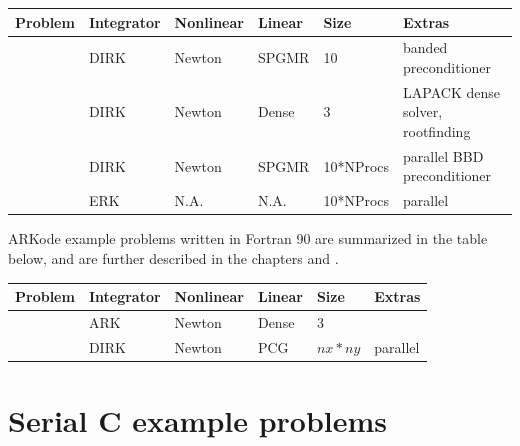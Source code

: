 \documentclass[letterpaper,10pt,english]{sphinxmanual}
\begin{document}
\begin{tabulary}{\linewidth}{|L|L|L|L|L|L|}
\hline
\textsf{\relax 
Problem
} & \textsf{\relax 
Integrator
} & \textsf{\relax 
Nonlinear
} & \textsf{\relax 
Linear
} & \textsf{\relax 
Size
} & \textsf{\relax 
Extras
}\\
\hline
{\hyperref[f77_serial:fark-diurnal-kry-bp]{\emph{}}}
 & 
DIRK
 & 
Newton
 & 
SPGMR
 & 
10
 & 
banded preconditioner
\\
\hline
{\hyperref[f77_serial:fark-roberts-dnsl]{\emph{}}}
 & 
DIRK
 & 
Newton
 & 
Dense
 & 
3
 & 
LAPACK dense solver, rootfinding
\\
\hline
{\hyperref[f77_parallel:fark-diag-kry-bbd-p]{\emph{}}}
 & 
DIRK
 & 
Newton
 & 
SPGMR
 & 
10*NProcs
 & 
parallel BBD preconditioner
\\
\hline
{\hyperref[f77_parallel:fark-diag-non-p]{\emph{}}}
 & 
ERK
 & 
N.A.
 & 
N.A.
 & 
10*NProcs
 & 
parallel
\\
\hline\end{tabulary}


ARKode example problems written in Fortran 90 are summarized in the table
below, and are further described in the chapters {\hyperref[f90_serial:serial-f90]{\emph{}}} and
{\hyperref[f90_parallel:parallel-f90]{\emph{}}}.

\begin{tabulary}{\linewidth}{|L|L|L|L|L|L|}
\hline
\textsf{\relax 
Problem
} & \textsf{\relax 
Integrator
} & \textsf{\relax 
Nonlinear
} & \textsf{\relax 
Linear
} & \textsf{\relax 
Size
} & \textsf{\relax 
Extras
}\\
\hline
{\hyperref[f90_serial:ark-bruss]{\emph{}}}
 & 
ARK
 & 
Newton
 & 
Dense
 & 
3
 & \\
\hline
{\hyperref[f90_parallel:fark-heat2d]{\emph{}}}
 & 
DIRK
 & 
Newton
 & 
PCG
 & 
\(nx*ny\)
 & 
parallel
\\
\hline\end{tabulary}



\chapter{Serial C example problems}
\label{c_serial:serial-c}\label{c_serial::doc}\label{c_serial:arkode-example-documentation}\label{c_serial:serial-c-example-problems}
\end{document}
